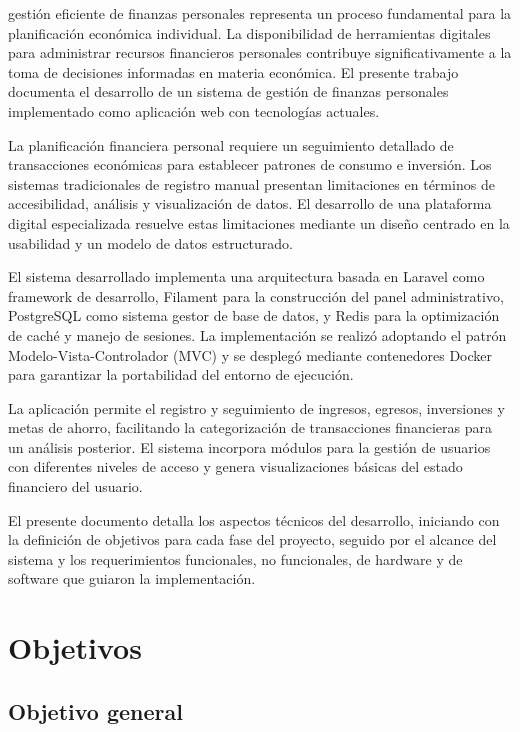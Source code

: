 \documentclass[journal]{IEEEtran}
\begin{document}
 gestión eficiente de finanzas personales representa un proceso fundamental para la planificación económica individual. La disponibilidad de herramientas digitales para administrar recursos financieros personales contribuye significativamente a la toma de decisiones informadas en materia económica. El presente trabajo documenta el desarrollo de un sistema de gestión de finanzas personales implementado como aplicación web con tecnologías actuales.

La planificación financiera personal requiere un seguimiento detallado de transacciones económicas para establecer patrones de consumo e inversión. Los sistemas tradicionales de registro manual presentan limitaciones en términos de accesibilidad, análisis y visualización de datos. El desarrollo de una plataforma digital especializada resuelve estas limitaciones mediante un diseño centrado en la usabilidad y un modelo de datos estructurado.

El sistema desarrollado implementa una arquitectura basada en Laravel como framework de desarrollo, Filament para la construcción del panel administrativo, PostgreSQL como sistema gestor de base de datos, y Redis para la optimización de caché y manejo de sesiones. La implementación se realizó adoptando el patrón Modelo-Vista-Controlador (MVC) y se desplegó mediante contenedores Docker para garantizar la portabilidad del entorno de ejecución.

La aplicación permite el registro y seguimiento de ingresos, egresos, inversiones y metas de ahorro, facilitando la categorización de transacciones financieras para un análisis posterior. El sistema incorpora módulos para la gestión de usuarios con diferentes niveles de acceso y genera visualizaciones básicas del estado financiero del usuario.

El presente documento detalla los aspectos técnicos del desarrollo, iniciando con la definición de objetivos para cada fase del proyecto, seguido por el alcance del sistema y los requerimientos funcionales, no funcionales, de hardware y de software que guiaron la implementación.

\section{Objetivos}

\subsection{Objetivo general}
\end{document}
